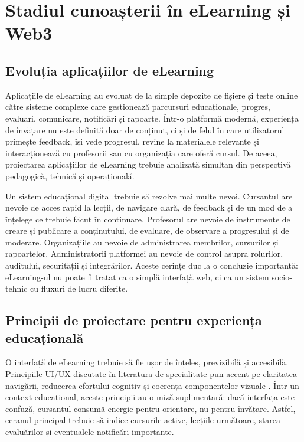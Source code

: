 \chapter{Stadiul cunoașterii în eLearning și Web3}

\section{Evoluția aplicațiilor de eLearning}
Aplicațiile de eLearning au evoluat de la simple depozite de fișiere și teste online către sisteme complexe care gestionează parcursuri educaționale, progres, evaluări, comunicare, notificări și rapoarte. Într-o platformă modernă, experiența de învățare nu este definită doar de conținut, ci și de felul în care utilizatorul primește feedback, își vede progresul, revine la materialele relevante și interacționează cu profesorii sau cu organizația care oferă cursul. De aceea, proiectarea aplicațiilor de eLearning trebuie analizată simultan din perspectivă pedagogică, tehnică și operațională.

Un sistem educațional digital trebuie să rezolve mai multe nevoi. Cursantul are nevoie de acces rapid la lecții, de navigare clară, de feedback și de un mod de a înțelege ce trebuie făcut în continuare. Profesorul are nevoie de instrumente de creare și publicare a conținutului, de evaluare, de observare a progresului și de moderare. Organizațiile au nevoie de administrarea membrilor, cursurilor și rapoartelor. Administratorii platformei au nevoie de control asupra rolurilor, auditului, securității și integrărilor. Aceste cerințe duc la o concluzie importantă: eLearning-ul nu poate fi tratat ca o simplă interfață web, ci ca un sistem socio-tehnic cu fluxuri de lucru diferite.

\section{Principii de proiectare pentru experiența educațională}
O interfață de eLearning trebuie să fie ușor de înțeles, previzibilă și accesibilă. Principiile UI/UX discutate în literatura de specialitate pun accent pe claritatea navigării, reducerea efortului cognitiv și coerența componentelor vizuale \cite{uiux_basics,uiux_comprehensive_guide}. Într-un context educațional, aceste principii au o miză suplimentară: dacă interfața este confuză, cursantul consumă energie pentru orientare, nu pentru învățare. Astfel, ecranul principal trebuie să indice cursurile active, lecțiile următoare, starea evaluărilor și eventualele notificări importante.

